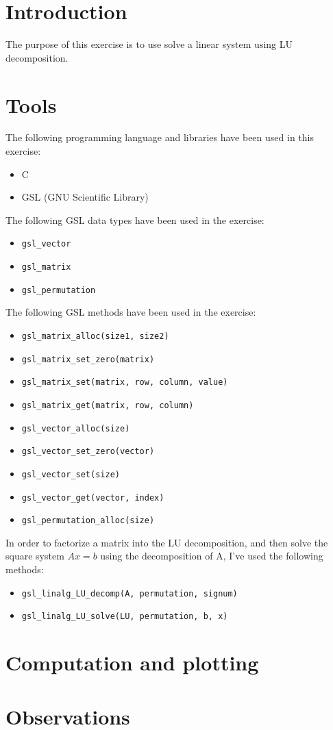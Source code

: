 \documentclass{article}
\newcommand{\code}{\texttt}
\begin{document}

\section{Introduction}\label{sec:intro}
The purpose of this exercise is to use solve a linear system using LU decomposition.\\

\section{Tools}
The following programming language and libraries have been used in this exercise:
\begin{itemize}
  \item C
  \item GSL (GNU Scientific Library)
\end{itemize}
The following GSL data types have been used in the exercise:
\begin{itemize}
  \item \code{gsl\_vector}
  \item \code{gsl\_matrix}
  \item \code{gsl\_permutation}
\end{itemize}
The following GSL methods have been used in the exercise:
\begin{itemize}
  \item \code{gsl\_matrix\_alloc(size1, size2)}
  \item \code{gsl\_matrix\_set\_zero(matrix)}
  \item \code{gsl\_matrix\_set(matrix, row, column, value)}
  \item \code{gsl\_matrix\_get(matrix, row, column)}
  \item \code{gsl\_vector\_alloc(size)}
  \item \code{gsl\_vector\_set\_zero(vector)}
  \item \code{gsl\_vector\_set(size)}
  \item \code{gsl\_vector\_get(vector, index)}
  \item \code{gsl\_permutation\_alloc(size)}
\end{itemize}
In order to factorize a matrix into the LU decomposition, and then solve the square system $Ax=b$ using the decomposition of A, I've used the following methods:
\begin{itemize}
  \item \code{gsl\_linalg\_LU\_decomp(A, permutation, signum)}
  \item \code{gsl\_linalg\_LU\_solve(LU, permutation, b, x)}
\end{itemize}
  
\section{Computation and plotting}
   
\section{Observations}
\end{document}

